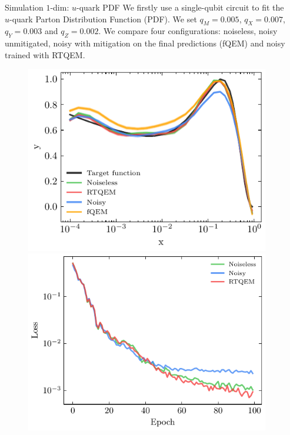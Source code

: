 \documentclass[20pt, final]{beamer}
\newlength{\colwidth}
\begin{document}
\begin{frame}[t]
\begin{columns}[t]
\begin{column}{\colwidth}
\begin{block}{Simulation $1$-dim:  $u$-quark PDF}
We firstly use a single-qubit circuit to fit the $u$-quark Parton Distribution 
Function (PDF). We set $q_M=0.005$, $q_X=0.007$, $q_Y=0.003$ and $q_Z=0.002$.
We compare four configurations: noiseless, noisy unmitigated, noisy with mitigation on 
the final predictions (fQEM) and noisy trained with RTQEM. 
\begin{figure}
  \centering
    \includegraphics[width=0.48\linewidth]{figures/qpdf.pdf}%
    \includegraphics[width=0.48\linewidth]{figures/qpdf_loss.pdf}
    \label{fig:qpdf_simulation}
  \end{figure}
\end{block}

\end{column}

\begin{column}{\colwidth}


\end{column}
\end{columns}
\end{frame}
\end{document}
